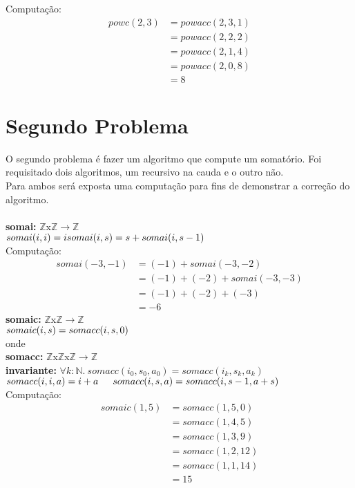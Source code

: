 \documentclass{article}
\begin{document}
Computação:\\
\begin{align*}
powc(2, 3) &= powacc(2, 3, 1)\\
&= powacc(2, 2, 2)\\
&= powacc(2, 1, 4)\\
&= powacc(2, 0, 8)\\
&= 8
\end{align*}

\section{Segundo Problema}
O segundo problema é fazer um algoritmo que compute um somatório.
Foi requisitado dois algoritmos, um recursivo na cauda e o outro não.\\
Para ambos será exposta uma computação para fins de demonstrar a correção do algoritmo.\\
\\
\noindent \textbf{somai:} $\mathbb{Z}$x$\mathbb{Z}$$ \rightarrow \mathbb{Z}$\\
$somai(i, i) = i\\
somai(i, s) = s + somai(i, s-1)\\$
\\
Computação:
\begin{align*}
somai(-3, -1) &= (-1) + somai(-3, -2)\\
&= (-1) + (-2) + somai(-3, -3)\\
&= (-1) + (-2) + (-3)\\
&= -6
\end{align*}
\noindent \textbf{somaic:} $\mathbb{Z}$x$\mathbb{Z}$$ \rightarrow \mathbb{Z}$\\
$somaic(i, s) = somacc(i, s, 0)\\$
\\
onde\\
\indent \textbf{somacc:} $\mathbb{Z}$x$\mathbb{Z}$x$\mathbb{Z}$$ \rightarrow \mathbb{Z}$\\
\indent \textbf{invariante:} $\forall k:\mathbb{N}.\: somacc(i_0, s_0, a_0) = somacc(i_k, s_k, a_k)$\\
\indent $somacc(i, i, a) = i + a\\
\indent somacc(i, s, a) = somacc(i, s-1, a+s)\\$
\\
Computação:
\begin{align*}
somaic(1, 5) &= somacc(1, 5, 0)\\
&= somacc(1, 4, 5)\\
&= somacc(1, 3, 9)\\
&= somacc(1, 2, 12)\\
&= somacc(1, 1, 14)\\
&= 15
\end{align*}
\end{document}
